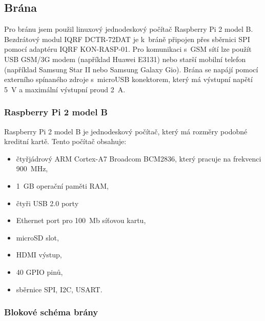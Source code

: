 \documentclass[12pt,a4paper,oneside]{article}
\begin{document}
\subsection{Brána}

Pro bránu jsem použil linuxový jednodeskový počítač Raspberry Pi 2 model B. Bezdrátový modul IQRF DCTR-72DAT je k~bráně připojen přes sběrnici SPI pomocí adaptéru IQRF KON-RASP-01. Pro komunikaci s~GSM sítí lze použít USB GSM/3G modem (například Huawei E3131) nebo starší mobilní telefon (například Samsung Star II nebo Samsung Galaxy Gio). Brána se napájí pomocí externího spínaného zdroje s~microUSB konektorem, který má výstupní napětí 5~V a maximální výstupní proud 2~A.

\subsubsection{Raspberry Pi 2 model B}

Raspberry Pi 2 model B je jednodeskový počítač, který má rozměry podobné kreditní kartě. Tento počítač obsahuje: 

\begin{itemize}
	\renewcommand{\baselinestretch}{1.5}
	\item čtyřjádrový ARM Cortex-A7 Broadcom BCM2836, který pracuje na frekvenci 900~MHz,
	\item 1~GB operační paměti RAM,
	\item čtyři USB 2.0 porty
	\item Ethernet port pro 100~Mb síťovou kartu,
	\item microSD slot,
	\item HDMI výstup,
	\item 40 GPIO pinů,
	\item sběrnice SPI, I2C, USART.
\end{itemize}

\newpage

\subsubsection{Blokové schéma brány}
\end{document}
